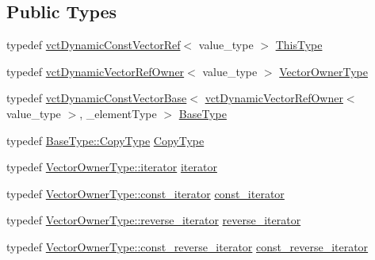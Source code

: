 \subsection*{Public Types}
\begin{DoxyCompactItemize}
\item 
typedef \hyperlink{classvct_dynamic_const_vector_ref}{vct\+Dynamic\+Const\+Vector\+Ref}$<$ value\+\_\+type $>$ \hyperlink{classvct_dynamic_const_vector_ref_a8da0588e2e355e6224badfd42845195e}{This\+Type}
\item 
typedef \hyperlink{classvct_dynamic_vector_ref_owner}{vct\+Dynamic\+Vector\+Ref\+Owner}$<$ value\+\_\+type $>$ \hyperlink{classvct_dynamic_const_vector_ref_a3399abece6e1a8d528f82fa8148a751d}{Vector\+Owner\+Type}
\item 
typedef \hyperlink{classvct_dynamic_const_vector_base}{vct\+Dynamic\+Const\+Vector\+Base}$<$ \hyperlink{classvct_dynamic_vector_ref_owner}{vct\+Dynamic\+Vector\+Ref\+Owner}$<$ value\+\_\+type $>$, \+\_\+element\+Type $>$ \hyperlink{classvct_dynamic_const_vector_ref_aba5f5c67feb404f0cf15c0f205625fec}{Base\+Type}
\item 
typedef \hyperlink{classvct_dynamic_const_vector_base_a010ba1a93ccebf494be5a188f923eb43}{Base\+Type\+::\+Copy\+Type} \hyperlink{classvct_dynamic_const_vector_ref_a32b6a671d547b46f2f972fea2352579a}{Copy\+Type}
\item 
typedef \hyperlink{classvct_dynamic_vector_ref_owner_aaee0b96d24843f333909f2aba3aad782}{Vector\+Owner\+Type\+::iterator} \hyperlink{classvct_dynamic_const_vector_ref_ac4d0cbe331233df2f11b5a51d665006f}{iterator}
\item 
typedef \hyperlink{classvct_dynamic_vector_ref_owner_a4f7a05e13925c0eeb1d5c754c3193ba0}{Vector\+Owner\+Type\+::const\+\_\+iterator} \hyperlink{classvct_dynamic_const_vector_ref_a745d586c746244f3326ca5a07c73dea5}{const\+\_\+iterator}
\item 
typedef \hyperlink{classvct_dynamic_vector_ref_owner_a3949acd3baa131459d464b058d249990}{Vector\+Owner\+Type\+::reverse\+\_\+iterator} \hyperlink{classvct_dynamic_const_vector_ref_a0f78f6ce35765714ea4dc8c182c6dc73}{reverse\+\_\+iterator}
\item 
typedef \hyperlink{classvct_dynamic_vector_ref_owner_a9ab3900ecbd8f4d4eb4615a2c9a972a3}{Vector\+Owner\+Type\+::const\+\_\+reverse\+\_\+iterator} \hyperlink{classvct_dynamic_const_vector_ref_af3fefcebbdfdf747813c57272961cd9d}{const\+\_\+reverse\+\_\+iterator}
\end{DoxyCompactItemize}
